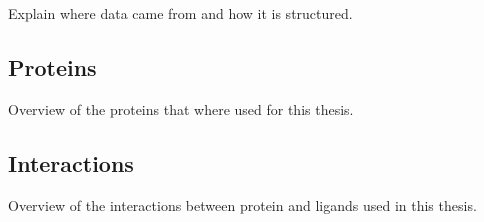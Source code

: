 Explain where data came from and how it is structured.

\subsection{Proteins}
Overview of the proteins that where used for this thesis.
\subsection{Interactions}
Overview of the interactions between protein and ligands used in this thesis.